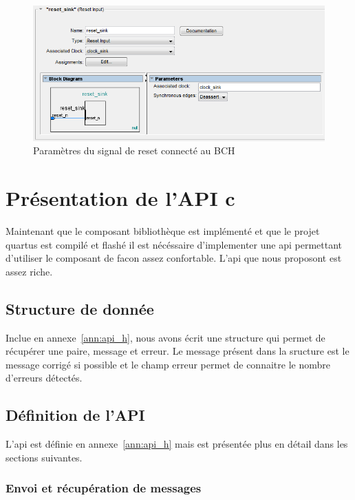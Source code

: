 \documentclass[a4paper, 11pt, svgnames]{report}
\begin{document}
        \begin{figure}[H]
            \centering
            \includegraphics[width=\textwidth]{./images/reset_sink}
            \caption{Paramètres du signal de reset connecté au BCH}
            \label{fig:reset_sink}
        \end{figure}

    \chapter{Présentation de l'API c}

    Maintenant que le composant bibliothèque est implémenté et que le projet
    quartus est compilé et flashé il est nécéssaire d'implementer une api
    permettant d'utiliser le composant de facon assez confortable. L'api que
    nous proposont est assez riche.

    \section{Structure de donnée}

    Inclue en annexe~\ref{ann:api_h}, nous avons écrit une structure qui permet
    de récupérer une paire, message et erreur. Le message présent dans la
    sructure est le message corrigé si possible et le champ erreur permet de
    connaitre le nombre d'erreurs détectés.

    \section{Définition de l'API}

    L'api est définie en annexe~\ref{ann:api_h} mais est présentée plus en
    détail dans les sections suivantes.

    \subsection{Envoi et récupération de messages}
\end{document}
